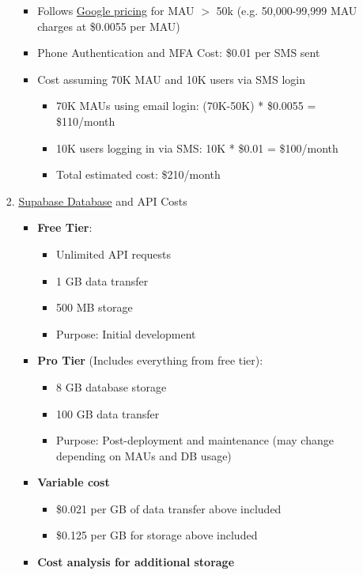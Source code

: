 \documentclass[12pt]{article}
\begin{document}
\begin{itemize}
\begin{itemize}
\begin{enumerate}
\begin{itemize}
					\item Follows \href{https://cloud.google.com/identity-platform/pricing}{Google pricing} for MAU $>$ 50k (e.g. 50,000-99,999 MAU charges at \$0.0055 per MAU)
					\item Phone Authentication and MFA Cost: \$0.01 per SMS sent
					\item Cost assuming 70K MAU and 10K users via SMS login
					\begin{itemize}
						\item 70K MAUs using email login: (70K-50K) * \$0.0055 = \$110/month
						\item 10K users logging in via SMS: 10K * \$0.01 = \$100/month
						\item Total estimated cost: \$210/month
					\end{itemize}
				\end{itemize}
				\item \href{https://supabase.com/pricing}{Supabase Database} and API Costs
				\begin{itemize}
					\item \textbf{Free Tier}:
					\begin{itemize}
						\item Unlimited API requests
						\item 1 GB data transfer
						\item 500 MB storage
						\item Purpose: Initial development
					\end{itemize}
					\item \textbf{Pro Tier} (Includes everything from free tier):
					\begin{itemize}
						\item 8 GB database storage
						\item 100 GB data transfer
						\item Purpose: Post-deployment and maintenance (may change depending on MAUs and DB usage)
					\end{itemize}
					\item \textbf{Variable cost}
					\begin{itemize}
						\item \$0.021 per GB of data transfer above included
						\item \$0.125 per GB for storage above included
					\end{itemize}
					\item \textbf{Cost analysis for additional storage}
					\begin{itemize}

\end{itemize}
\end{itemize}
\end{enumerate}
\end{itemize}
\end{itemize}
\end{document}
